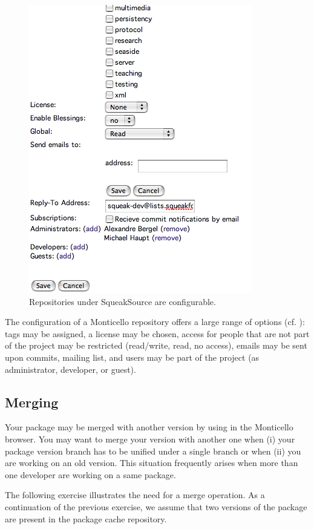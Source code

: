 \documentclass[a4paper,10pt,twoside]{book}
\begin{document}
\begin{figure}[ht]\centering
	\includegraphics[width=.55\linewidth]{squeaksourcesetting}
	\caption{Repositories under SqueakSource are configurable.}
\end{figure}

The configuration of a Monticello repository offers a large range of options (cf. ): tags may be assigned, a license may be chosen, access for people that are not part of the project may be restricted (read/write, read, no access), emails may be sent upon commits, mailing list, and users may be part of the project (as administrator, developer, or guest).



\subsection{Merging}

Your package may be merged with another version by using  in the Monticello browser. You may want to merge your version with another one when (i) your package version branch has to be unified under a single branch or when (ii) you are working on an old version. This situation frequently arises when more than one developer are working on a same package. 

The following exercise illustrates the need for a merge operation. As a continuation of the previous exercise, we assume that two versions of the  package are present in the package cache repository.
\end{document}
